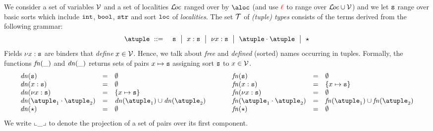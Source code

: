 %

We consider a set of variables $\varset$ 
and a set of localities $\locset$ ranged over by $\aloc$ (and
use $\alocvar$ to range over $\locset\cup\varset$) and we let $\asort$
range over basic sorts which include $\asort[int]$, $\asort[bool]$,
$\asort[str]$ and sort $\asort[loc]$ of \emph{localities}.
%
The set $\tupleset$ of \emph{(tuple) types} consists of the terms
derived from the following grammar:
\begin{eqnarray*}
  \atuple & \bnfdef & \asort \bnfmid
                      x : \asort \bnfmid
                      \nu x : \asort  \bnfmid
                      \atuple \cdot \atuple \bnfmid
                      \wildcard
\end{eqnarray*}
Fields $\nu x : \asort$ are binders that \emph{define}
$x \in \varset$.
%
Hence, we talk about \emph{free} and \emph{defined} (sorted) names occurring in
tuples.
%
%
Formally, the functions $\fn{\_}$ and $\dn{\_}$ returns sets of pairs
$x \mapsto \asort$ assigning sort $\asort$ to $x \in \varset$.
\[
\begin{array}{l@{\hspace{1cm}}l}
\begin{array}{lcl}
  \dn\asort & = & \emptyset
  \\
  \dn{x : \asort} & = & \emptyset
  \\
  \dn{\nu x : \asort} & = & \{x \mapsto \asort \}
  \\
  \dn{\atuple_1 \cdot \atuple_2} & = & \dn{\atuple_1} \cup \dn{\atuple_2}
  \\
  \dn{\wildcard} & = & \emptyset
\end{array}
&
\begin{array}{lcl}
  \fn\asort & = & \emptyset
  \\
  \fn{x : \asort} & = &  \{x \mapsto \asort\}
  \\
  \fn{\nu x : \asort} & = & \emptyset
  \\
  \fn{\atuple_1 \cdot \atuple_2} & = & \fn{\atuple_1} \cup \fn{\atuple_2}
  \\
  \fn{\wildcard} & = & \emptyset
\end{array}
\end{array}
\]
We write $\supp{\_}$ to denote the projection of a set of pairs over its first component. 

